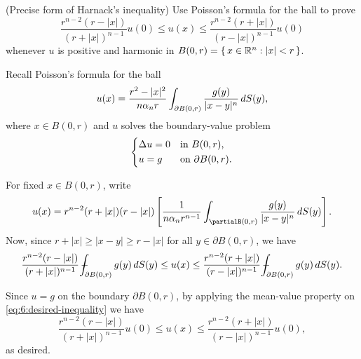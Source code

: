 \begin{problem}
  (Precise form of Harnack's inequality) Use Poisson's formula for the ball
  to prove
  \[
    \frac{r^{n-2}(r-|x|)}{(r+|x|)^{n-1}}u(0)%
    \leq u(x)%
    \leq \frac{r^{n-2}(r+|x|)}{(r-|x|)^{n-1}}u(0)
  \]
  whenever \(u\) is positive and harmonic in
  \(B(0,r)=\{\,x\in\mathbb{R}^n:|x|<r\,\}\).
\end{problem}
\begin{solution*}
  Recall Poisson's formula for the ball
  \begin{equation}
    \label{eq:6:poissons-formula}
    u(x)=\frac{r^2-|x|^2}{n\alpha_nr}
    \int_{\partial B(0,r)}\frac{g(y)}{|x-y|^n}\mathop{}\!d S(y),
  \end{equation}
  where \(x\in B(0,r)\) and \(u\) solves the boundary-value problem
  \[
    \left\{
      \begin{aligned}
        &\Delta u=0&&\text{in \(B(0,r)\),}\\
        &u=g&&\text{on \(\partial B(0,r)\).}
      \end{aligned}
    \right.
  \]

  For fixed \(x\in B(0,r)\), write
  \[
    u(x)=r^{n-2}(r+|x|)(r-|x|)%
    \left[%
      \frac{1}{n\alpha_n r^{n-1}} \int_{\partial%
        B(0,r)}\frac{g(y)}{|x-y|^n}\diff S(y)%
    \right]%
    .
  \]
  Now, since \(r+|x|\geq |x-y|\geq r-|x|\) for all \(y\in\partial B(0,r)\),
  we have
  \begin{equation}
    \label{eq:6:desired-inequality}
    \frac{r^{n-2}(r-|x|)}{(r+|x|)^{n-1}}\fint_{\partial
      B(0,r)}g(y)\diff S(y)\leq u(x)
    \leq\frac{r^{n-2}(r+|x|)}{(r-|x|)^{n-1}}\fint_{\partial
      B(0,r)}g(y)\diff S(y).
  \end{equation}

  Since \(u=g\) on the boundary \(\partial B(0,r)\), by applying the
  mean-value property on \eqref{eq:6:desired-inequality} we have
  \[
    \frac{r^{n-2}(r-|x|)}{(r+|x|)^{n-1}}u(0)\leq
    u(x)\leq
    \frac{r^{n-2}(r+|x|)}{(r-|x|)^{n-1}}u(0),
  \]
  as desired.
\end{solution*}

